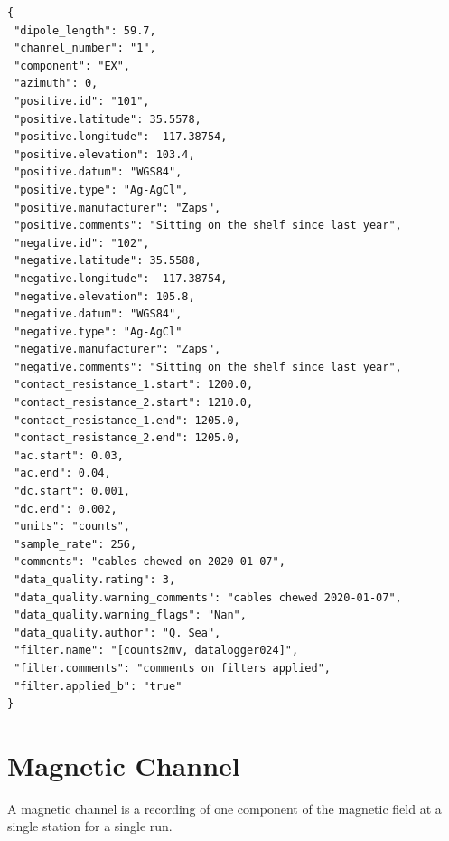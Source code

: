 \documentclass{article}
\begin{document}
\begin{verbatim}
{
 "dipole_length": 59.7,
 "channel_number": "1",
 "component": "EX",
 "azimuth": 0,
 "positive.id": "101",
 "positive.latitude": 35.5578,
 "positive.longitude": -117.38754,
 "positive.elevation": 103.4,
 "positive.datum": "WGS84",
 "positive.type": "Ag-AgCl",
 "positive.manufacturer": "Zaps",
 "positive.comments": "Sitting on the shelf since last year",
 "negative.id": "102",
 "negative.latitude": 35.5588,
 "negative.longitude": -117.38754,
 "negative.elevation": 105.8,
 "negative.datum": "WGS84",
 "negative.type": "Ag-AgCl"
 "negative.manufacturer": "Zaps",
 "negative.comments": "Sitting on the shelf since last year",
 "contact_resistance_1.start": 1200.0,
 "contact_resistance_2.start": 1210.0,
 "contact_resistance_1.end": 1205.0,
 "contact_resistance_2.end": 1205.0,
 "ac.start": 0.03,
 "ac.end": 0.04,
 "dc.start": 0.001,
 "dc.end": 0.002,
 "units": "counts",
 "sample_rate": 256,
 "comments": "cables chewed on 2020-01-07",
 "data_quality.rating": 3,
 "data_quality.warning_comments": "cables chewed 2020-01-07",
 "data_quality.warning_flags": "Nan",
 "data_quality.author": "Q. Sea",
 "filter.name": "[counts2mv, datalogger024]",
 "filter.comments": "comments on filters applied",
 "filter.applied_b": "true"
}
\end{verbatim}

\newpage
\section{Magnetic Channel}

A magnetic channel is a recording of one component of the magnetic field at a single station for a single run.
\end{document}
